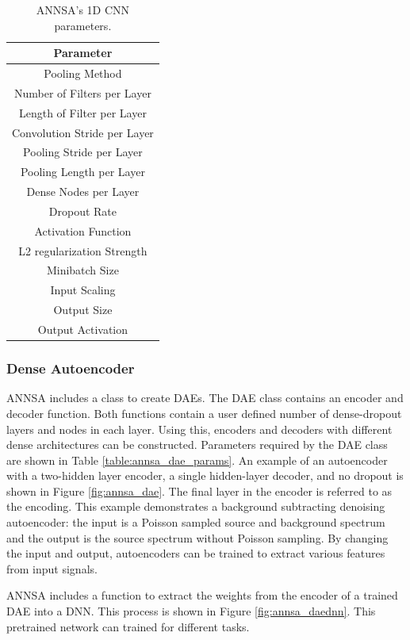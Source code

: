 \begin{table}[H]
\centering
\caption{ANNSA's 1D CNN parameters.}
\begin{tabular}{c}
\hline
Parameter \\ \hline
Pooling Method \\
Number of Filters per Layer \\
Length of Filter per Layer \\
Convolution Stride per Layer \\
Pooling Stride per Layer \\
Pooling Length per Layer \\
Dense Nodes per Layer \\
Dropout Rate \\
Activation Function \\
L2 regularization Strength \\ 
Minibatch Size \\ 
Input Scaling \\
Output Size \\
Output Activation \\ \hline
\end{tabular}
\label{table:annsa_cnn_params}
\end{table}

\subsubsection{Dense Autoencoder}

ANNSA includes a class to create DAEs. The DAE class contains an encoder and decoder function. Both functions contain a user defined number of dense-dropout layers and nodes in each layer. Using this, encoders and decoders with different dense architectures can be constructed. Parameters required by the DAE class are shown in Table \ref{table:annsa_dae_params}. An example of an autoencoder with a two-hidden layer encoder, a single hidden-layer decoder, and no dropout is shown in Figure \ref{fig:annsa_dae}. The final layer in the encoder is referred to as the encoding. This example demonstrates a background subtracting denoising autoencoder: the input is a Poisson sampled source and background spectrum and the output is the source spectrum without Poisson sampling. By changing the input and output, autoencoders can be trained to extract various features from input signals.

ANNSA includes a function to extract the weights from the encoder of a trained DAE into a DNN. This process is shown in Figure \ref{fig:annsa_daednn}. This pretrained network can trained for different tasks.

